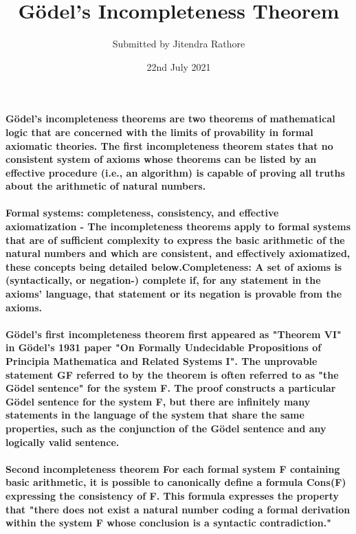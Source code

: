 \documentclass{article}
\title{Gödel's Incompleteness Theorem}
\author{Submitted by Jitendra Rathore}
\date{22nd July 2021}
\begin{document}
\maketitle 
\paragraph{Gödel's incompleteness theorems are two theorems of mathematical logic that are concerned with the limits of provability in formal axiomatic theories. The first incompleteness theorem states that no consistent system of axioms whose theorems can be listed by an effective procedure (i.e., an algorithm) is capable of proving all truths about the arithmetic of natural numbers.}

\paragraph{Formal systems: completeness, consistency, and effective axiomatization - The incompleteness theorems apply to formal systems that are of sufficient complexity to express the basic arithmetic of the natural numbers and which are consistent, and effectively axiomatized, these concepts being detailed below.Completeness: A set of axioms is (syntactically, or negation-) complete if, for any statement in the axioms' language, that statement or its negation is provable from the axioms.}

\paragraph{Gödel's first incompleteness theorem first appeared as "Theorem VI" in Gödel's 1931 paper "On Formally Undecidable Propositions of Principia Mathematica and Related Systems I".
The unprovable statement GF referred to by the theorem is often referred to as "the Gödel sentence" for the system F. The proof constructs a particular Gödel sentence for the system F, but there are infinitely many statements in the language of the system that share the same properties, such as the conjunction of the Gödel sentence and any logically valid sentence.}

\paragraph{Second incompleteness theorem For each formal system F containing basic arithmetic, it is possible to canonically define a formula Cons(F) expressing the consistency of F. This formula expresses the property that "there does not exist a natural number coding a formal derivation within the system F whose conclusion is a syntactic contradiction."}
\end{document}
